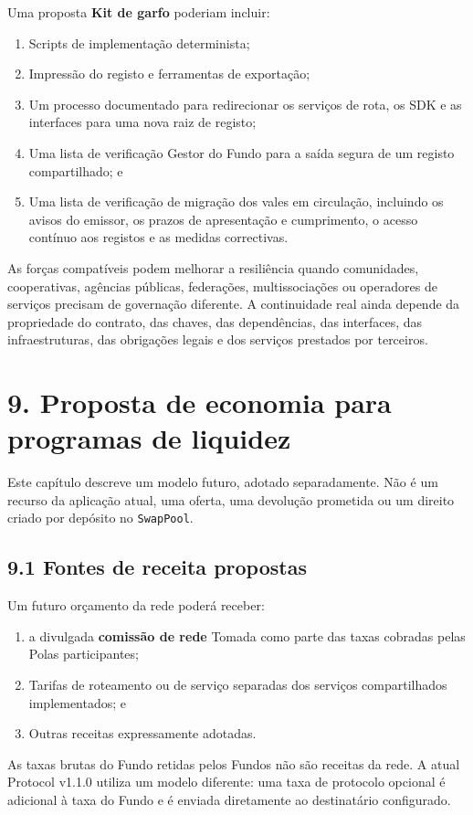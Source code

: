 \documentclass[11pt]{article}
\begin{document}
Uma proposta \textbf{Kit de garfo} poderiam incluir:

\begin{enumerate}[leftmargin=*]
\item Scripts de implementação determinista;
\item Impressão do registo e ferramentas de exportação;
\item Um processo documentado para redirecionar os serviços de rota, os SDK e as interfaces para uma nova raiz de registo;
\item Uma lista de verificação Gestor do Fundo para a saída segura de um registo compartilhado; e
\item Uma lista de verificação de migração dos vales em circulação, incluindo os avisos do emissor, os prazos de apresentação e cumprimento, o acesso contínuo aos registos e as medidas correctivas.
\end{enumerate}
As forças compatíveis podem melhorar a resiliência quando comunidades, cooperativas, agências públicas, federações, multissociações ou operadores de serviços precisam de governação diferente. A continuidade real ainda depende da propriedade do contrato, das chaves, das dependências, das interfaces, das infraestruturas, das obrigações legais e dos serviços prestados por terceiros.


\section*{9. Proposta de economia para programas de liquidez}

Este capítulo descreve um modelo futuro, adotado separadamente. Não é um recurso da aplicação atual, uma oferta, uma devolução prometida ou um direito criado por depósito no \texttt{SwapPool}.

\subsection*{9.1 Fontes de receita propostas}

Um futuro orçamento da rede poderá receber:

\begin{enumerate}[leftmargin=*]
\item a divulgada \textbf{comissão de rede} Tomada como parte das taxas cobradas pelas Polas participantes;
\item Tarifas de roteamento ou de serviço separadas dos serviços compartilhados implementados; e
\item Outras receitas expressamente adotadas.
\end{enumerate}
As taxas brutas do Fundo retidas pelos Fundos não são receitas da rede. A atual Protocol v1.1.0 utiliza um modelo diferente: uma taxa de protocolo opcional é adicional à taxa do Fundo e é enviada diretamente ao destinatário configurado.
\end{document}
